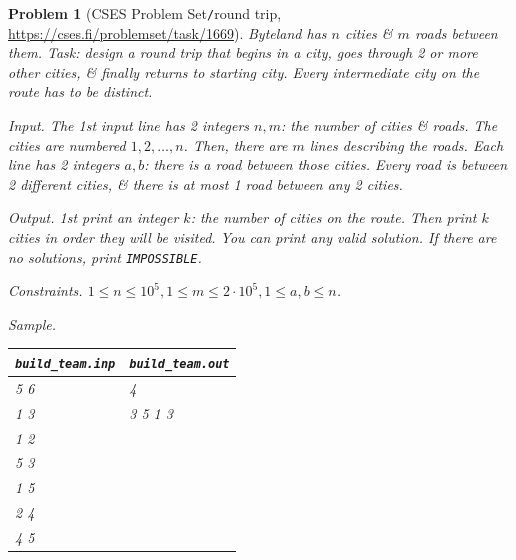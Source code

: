 \documentclass[oneside]{book}
\newtheorem{problem}{Problem}
\begin{document}
\begin{problem}[CSES Problem Set{\tt/}round trip, \url{https://cses.fi/problemset/task/1669}]
	Byteland has $n$ cities \& $m$ roads between them. Task: design a round trip that begins in a city, goes through 2 or more other cities, \& finally returns to starting city. Every intermediate city on the route has to be distinct.
	\item {\sf Input.} The 1st input line has 2 integers $n,m$: the number of cities \& roads. The cities are numbered $1,2,\ldots,n$. Then, there are $m$ lines describing the roads. Each line has 2 integers $a,b$: there is a road between those cities. Every road is between 2 different cities, \& there is at most 1 road between any 2 cities.
	\item {\sf Output.} 1st print an integer $k$: the number of cities on the route. Then print $k$ cities in order they will be visited. You can print any valid solution. If there are no solutions, print {\tt IMPOSSIBLE}.
	\item {\sf Constraints.} $1\le n\le10^5,1\le m\le2\cdot10^5,1\le a,b\le n$.
	\item {\sf Sample.}
	\begin{table}[H]
		\centering
		\begin{tabular}{|l|l|}
			\hline
			\verb|build_team.inp| & \verb|build_team.out| \\
			\hline
			5 6 & 4 \\
			1 3 & 3 5 1 3 \\
			1 2 & \\
			5 3 & \\
			1 5 & \\
			2 4 & \\
			4 5 & \\
			\hline
		\end{tabular}
	\end{table}
\end{problem}
\end{document}
